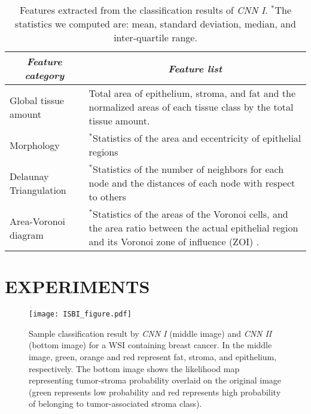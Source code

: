 \documentclass{article}
\begin{document}
\begin{table}[htbp]
\footnotesize
\centering
\begin{tabularx}{\linewidth}{|l|X|}
\hline
\multicolumn{1}{|c|}{\textit{\textbf{Feature category}}} & \multicolumn{1}{c|}{\textit{\textbf{Feature list}}}                                                   \tabularnewline \hline
Global tissue amount                                               & Total area of epithelium, stroma, and fat and the normalized areas of each tissue class by the total tissue amount.                                                     \tabularnewline \hline
Morphology                                              & $^*$Statistics of the area and eccentricity of epithelial regions                                                                                  \tabularnewline \hline
Delaunay Triangulation                                           &  $^*$Statistics of the number of neighbors for each node and the distances of each node with respect to others                                                                \tabularnewline \hline
Area-Voronoi diagram                                           &  $^*$Statistics of the areas of the Voronoi cells, and the area ratio between the actual epithelial region and its Voronoi zone of influence (ZOI) \cite{bejnordi2013}.                                                               \tabularnewline \hline
\end{tabularx}
\vspace{-1.0em}
\caption{Features extracted from the classification results of \textit{CNN I}. $^*$The statistics we computed are: mean, standard deviation, median, and inter-quartile range.}
\label{table:economicSchools2} 
	\vspace{-0.7em}  
\end{table}
\section{EXPERIMENTS}
\label{sec:format}
\vspace*{-5 pt}

\begin{figure}[htb]
	\centering
		\texttt{[image: ISBI\_figure.pdf]}
	\caption{\footnotesize{Sample classification result by \textit{CNN I} (middle image) and \textit{CNN II} (bottom image) for a WSI containing breast cancer. In the middle image, green, orange and red represent fat, stroma, and epithelium, respectively. The bottom image shows the likelihood map representing tumor-stroma probability overlaid on the original image (green represents low probability and red represents high probability of belonging to tumor-associated stroma class).}}
	\label{fig:Sample}
\end{figure}
\end{document}
